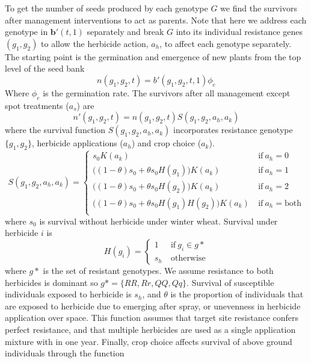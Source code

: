 \documentclass[12pt, a4paper]{article}
\begin{document}
To get the number of seeds produced by each genotype $G$ we find the survivors after management interventions to act as parents. Note that here we address each genotype in $\mathbf{b}'(t, 1)$ separately and break $G$ into its individual resistance genes $(g_1, g_2)$ to allow the herbicide action, $a_h$, to affect each genotype separately. The starting point is the germination and emergence of new plants from the top level of the seed bank
\begin{equation}\label{eq:ag}
	n(g_1, g_2, t) = b'(g_1, g_2, t, 1)\phi_e
\end{equation}
Where $\phi_e$ is the germination rate. The survivors after all management except spot treatments ($a_s$) are
\begin{equation}\label{eq:ab_sur}
	n'(g_1, g_2, t) = n(g_1, g_2, t)S(g_1, g_2, a_h, a_k) 
\end{equation}
where the survival function $S(g_1, g_2, a_h, a_k)$ incorporates resistance genotype $\{g_1, g_2\}$, herbicide applications ($a_h$) and crop choice ($a_k$).
\begin{equation}\label{eq:sur}
	S(g_1, g_2, a_h, a_k) = \begin{cases}
		s_0 K(a_k) &~\text{if} ~ a_h = 0 \\
		\big((1 - \theta)s_0 + \theta s_0 H(g_1)\big) K(a_k) &~\text{if}~a_h = 1 \\
		\big((1 - \theta)s_0 + \theta s_0 H(g_2) \big) K(a_k) &~ \text{if} ~ a_h = 2 \\
		\big((1 - \theta)s_0 + \theta s_0 H(g_1) H(g_2)\big) K(a_k) &~ \text{if} ~ a_h = \text{both} \\	
	\end{cases} 
\end{equation}
where $s_0$ is survival without herbicide under winter wheat. Survival under herbicide $i$ is 
\begin{equation}
	H(g_i) = \begin{cases}
		1 &~\text{if}~g_i \in g*\\
		s_h &~\text{otherwise}
	\end{cases}
\end{equation}
where $g*$ is the set of resistant genotypes. We assume resistance to both herbicides is dominant so $g* = \{RR, Rr, QQ, Qq\}$. Survival of susceptible individuals exposed to herbicide is $s_h$, and $\theta$ is the proportion of individuals that are exposed to herbicide due to emerging after spray, or unevenness in herbicide application over space. This function assumes that target site resistance confers perfect resistance, and that multiple herbicides are used as a single application mixture with in one year. Finally, crop choice affects survival of above ground individuals through the function
\end{document}
